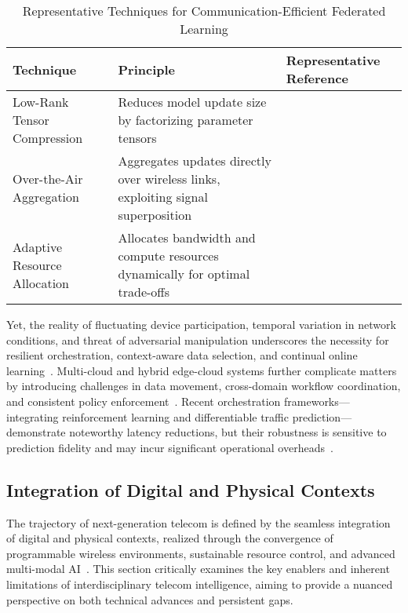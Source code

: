\documentclass[sigconf]{acmart}
\begin{document}
\begin{table*}[htbp]
\centering
\caption{Representative Techniques for Communication-Efficient Federated Learning}
\label{tab:fed_techniques}
\begin{adjustbox}{max width=\textwidth}
\begin{tabular}{lll}
\toprule
\textbf{Technique} & \textbf{Principle} & \textbf{Representative Reference} \\
\midrule
Low-Rank Tensor Compression & Reduces model update size by factorizing parameter tensors & \cite{ref39} \\
Over-the-Air Aggregation    & Aggregates updates directly over wireless links, exploiting signal superposition & \cite{ref42} \\
Adaptive Resource Allocation & Allocates bandwidth and compute resources dynamically for optimal trade-offs & \cite{ref48} \\
\bottomrule
\end{tabular}
\end{adjustbox}
\end{table*}

Yet, the reality of fluctuating device participation, temporal variation in network conditions, and threat of adversarial manipulation underscores the necessity for resilient orchestration, context-aware data selection, and continual online learning~\cite{ref25,ref39}. Multi-cloud and hybrid edge-cloud systems further complicate matters by introducing challenges in data movement, cross-domain workflow coordination, and consistent policy enforcement~\cite{ref26,ref48}. Recent orchestration frameworks—integrating reinforcement learning and differentiable traffic prediction—demonstrate noteworthy latency reductions, but their robustness is sensitive to prediction fidelity and may incur significant operational overheads~\cite{ref42}.

\subsection{Integration of Digital and Physical Contexts}

The trajectory of next-generation telecom is defined by the seamless integration of digital and physical contexts, realized through the convergence of programmable wireless environments, sustainable resource control, and advanced multi-modal AI~\cite{ref7,ref10,ref17,ref18,ref19,ref20,ref21,ref22,ref23,ref24,ref25,ref26,ref27,ref28,ref29,ref30,ref35,ref39,ref40}. This section critically examines the key enablers and inherent limitations of interdisciplinary telecom intelligence, aiming to provide a nuanced perspective on both technical advances and persistent gaps.
\end{document}
